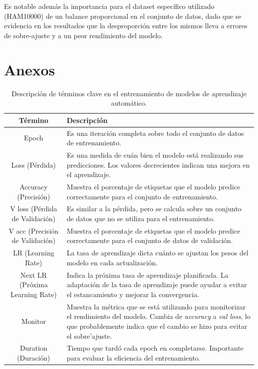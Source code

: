 Es notable además la importancia para el dataset específico utilizado (HAM10000) de un balance proporcional en el conjunto de datos, dado que se evidencia en los resultados que la desproporción entre los mismos lleva a errores de sobre-ajuste y a un peor rendimiento del modelo.

\section*{Anexos}

\begin{table}[ht]
    \centering
    \small
    \begin{tabular}{|c|p{10cm}|}
    \hline
    \textbf{Término} & \textbf{Descripción} \\
    \hline
    Epoch & Es una iteración completa sobre todo el conjunto de datos de entrenamiento. \\
    \hline
    Loss (Pérdida) & Es una medida de cuán bien el modelo está realizando sus predicciones. Los valores decrecientes indican una mejora en el aprendizaje. \\
    \hline
    Accuracy (Precisión) & Muestra el porcentaje de etiquetas que el modelo predice correctamente para el conjunto de entrenamiento. \\
    \hline
    V loss (Pérdida de Validación) & Es similar a la pérdida, pero se calcula sobre un conjunto de datos que no se utiliza para el entrenamiento. \\
    \hline
    V acc (Precisión de Validación) & Muestra el porcentaje de etiquetas que el modelo predice correctamente para el conjunto de datos de validación. \\
    \hline
    LR (Learning Rate) & La tasa de aprendizaje dicta cuánto se ajustan los pesos del modelo en cada actualización. \\
    \hline
    Next LR (Próxima Learning Rate) & Indica la próxima tasa de aprendizaje planificada. La adaptación de la tasa de aprendizaje puede ayudar a evitar el estancamiento y mejorar la convergencia. \\
    \hline
    Monitor & Muestra la métrica que se está utilizando para monitorizar el rendimiento del modelo. Cambia de \textit{accuracy} a \textit{val loss}, lo que probablemente indica que el cambio se hizo para evitar el sobre'ajuste. \\
    \hline
    Duration (Duración) & Tiempo que tardó cada epoch en completarse. Importante para evaluar la eficiencia del entrenamiento. \\
    \hline
    \end{tabular}
    \caption{Descripción de términos clave en el entrenamiento de modelos de aprendizaje automático.}
    \label{table:terminology}
    \end{table}

